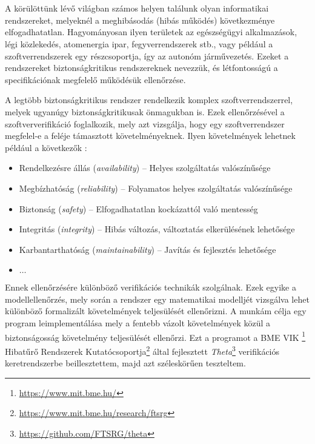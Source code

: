 \chapter{\bevezetes}

A körülöttünk lévő világban számos helyen találunk olyan informatikai rendszereket, melyeknél a meghibásodás (hibás működés) következménye elfogadhatatlan. Hagyományosan ilyen területek az egészségügyi alkalmazások, légi közlekedés, atomenergia ipar, fegyverrendszerek stb., vagy például a szoftverrendszerek egy részcsoportja, így az autonóm járművezetés. Ezeket a rendszereket biztonságkritikus rendszereknek nevezzük, és létfontosságú a specifikációnak megfelelő működésük ellenőrzése.

A legtöbb biztonságkritikus rendszer rendelkezik komplex szoftverrendszerrel, melyek ugyanúgy biztonságkritikusak önmagukban is. Ezek ellenőrzésével a szoftververifikáció foglalkozik, mely azt vizsgálja, hogy egy szoftverrendszer megfelel-e a feléje támasztott követelményeknek. Ilyen követelmények lehetnek például a következők \cite{alapfogalmak}:
\begin{itemize}
	\item Rendelkezésre állás (\emph{availability}) -- Helyes szolgáltatás valószínűsége
	\item Megbízhatóság (\emph{reliability}) -- Folyamatos helyes szolgáltatás valószínűsége
	\item Biztonság (\emph{safety}) -- Elfogadhatatlan kockázattól való mentesség
	\item Integritás (\emph{integrity}) -- Hibás változás, változtatás elkerülésének lehetősége
	\item Karbantarthatóság (\emph{maintainability}) -- Javítás és fejlesztés lehetősége
	\item $\dots$
\end{itemize}
Ennek ellenőrzésére különböző verifikációs technikák szolgálnak. Ezek egyike a modellellenőrzés, mely során a rendszer egy matematikai modelljét vizsgálva lehet különböző formalizált követelmények teljesülését ellenőrizni.
\newline
\newline
A munkám célja egy program leimplementálása mely a fentebb vázolt követelmények közül a biztonságosság követelmény teljesülését ellenőrzi. Ezt a programot a BME VIK \bmemit\footnote{\url{https://www.mit.bme.hu/}} Hibatűrő Rendszerek Kutatócsoportja\footnote{\url{https://www.mit.bme.hu/research/ftsrg}} által fejlesztett \emph{Theta}\footnote{\url{https://github.com/FTSRG/theta}} verifikációs keretrendszerbe beillesztettem, majd azt széleskörűen teszteltem.
